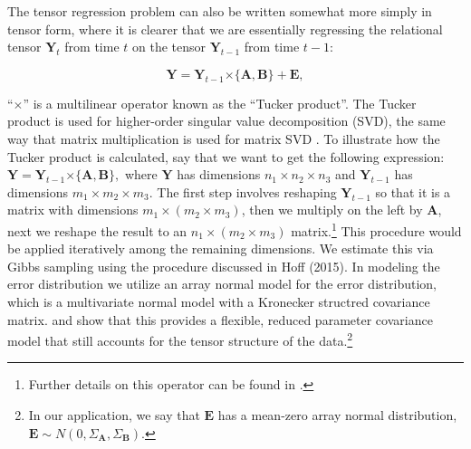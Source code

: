 \documentclass[12pt,pdflatex]{elsarticle}
\newcommand{\bl}[1]{{\mathbf #1}}
\begin{document}
The tensor regression problem can also be written somewhat more simply in tensor form, where it is clearer that we are essentially regressing the relational tensor $\bl Y_t$ from time $t$ on the tensor $\bl Y_{t-1}$ from time $t-1$:

\begin{equation}
	\bl Y = \bl Y_{t-1} \boldsymbol{\times} \{ \bl A, \bl B \} + \bl E ,
	\label{eqn:mltr}
\end{equation}

``$\boldsymbol{\times}$'' is a multilinear operator known as the ``Tucker product''. The Tucker product is used for higher-order singular value decomposition (SVD), the same way that matrix multiplication is used for matrix SVD \citep{kolda:bader:2009}. To illustrate how the Tucker product is calculated, say that we want to get the following expression: $\bl Y = \bl Y_{t-1} \boldsymbol{\times} \{ \bl A, \bl B\},$ where $\bl Y$ has dimensions $n_{1} \times n_{2} \times n_{3}$ and $\bl Y_{t-1}$ has dimensions $m_{1} \times m_{2} \times m_{3}$. The first step involves reshaping $\bl Y_{t-1}$ so that it is a matrix with  dimensions $m_{1} \times (m_{2} \times m_{3})$, then we multiply on the left by $\bl A$, next we reshape the result to an $n_{1} \times (m_{2} \times m_{3})$ matrix.\footnote{Further details on this operator can be found in \citet{kolda:2006}.} This procedure would be applied iteratively among the remaining dimensions. We estimate this via Gibbs sampling using the procedure discussed in Hoff (2015). In modeling the error distribution we utilize an array normal model for the error distribution, which is a multivariate normal model with a Kronecker structred covariance matrix. \citet{akdemir:gupta:2011} and \citet{hoff:2011a} show that this provides a flexible, reduced parameter covariance model that still accounts for the tensor structure of the data.\footnote{In our application, we say that $\bl E$ has a mean-zero array normal distribution, $\bl E \sim N(0, \Sigma_{\bl A}, \Sigma_{\bl B})$.}
\end{document}
